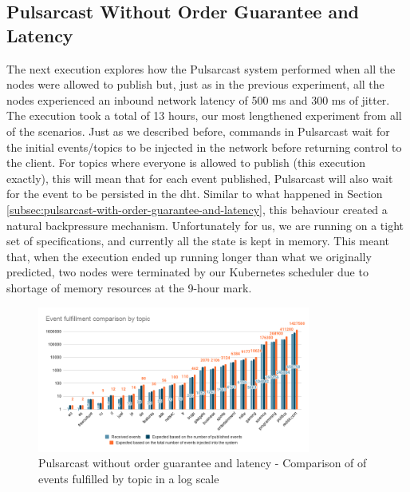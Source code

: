 \subsection{Pulsarcast Without Order Guarantee and Latency}\label{subsec:pulsarcast-without-order-guarantee-and-latency}

The next execution explores how the Pulsarcast system performed when all the
nodes were allowed to publish but, just as in the previous experiment, all the
nodes experienced an inbound network latency of 500 ms and 300 ms of jitter.
The execution took a total of 13 hours, our most lengthened experiment from all
of the scenarios. Just as we described before, commands in Pulsarcast wait for
the initial events/topics to be injected in the network before returning
control to the client. For topics where everyone is allowed to publish (this
execution exactly), this will mean that for each event published, Pulsarcast
will also wait for the event to be persisted in the \acrshort{dht}. Similar to
what happened in Section
\ref{subsec:pulsarcast-with-order-guarantee-and-latency}, this behaviour
created a natural backpressure mechanism. Unfortunately for us, we are running
on a tight set of specifications, and currently all the state is kept in
memory. This meant that, when the execution ended up running longer than what
we originally predicted, two nodes were terminated by our Kubernetes scheduler
due to shortage of memory resources at the 9-hour mark.

\begin{figure}[!htb]
  \centering
  \includegraphics[width=0.8\textwidth]{img/graph-pulsarcast-latency-event-fulfillment-comparison.png}
  \caption{Pulsarcast without order guarantee and latency - Comparison of of events fulfilled by topic in a log scale}
  \label{fig:graph-pulsarcast-latency-event-fulfillment-comparison}
\end{figure}

